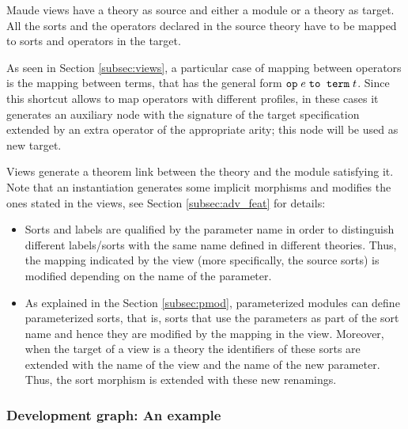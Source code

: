 Maude views have a theory as source and either a module or a theory
as target. All the sorts and the operators declared in the source theory
have to be mapped to sorts and operators in the target.

As seen in Section \ref{subsec:views}, a particular case of mapping
between operators is the mapping between
terms, that has the general form $\verb"op" \; e \; \verb"to term" \; t$.
Since this shortcut allows to map operators with different profiles,
in these cases it generates an auxiliary node with the signature of the
target specification extended by an extra operator of the appropriate arity;
this node will be used as new target.

Views generate a theorem
link between the theory and the module satisfying it.
Note that an instantiation generates some implicit morphisms and modifies
the ones stated in the views, see Section \ref{subsec:adv_feat} for details:
\begin{itemize}

\item
Sorts and labels are qualified by the parameter name in order to distinguish
different labels/sorts with the same name defined in different theories. Thus,
the mapping indicated by the view (more specifically, the source sorts) is
modified depending on the name of the parameter.

\item
As explained in the Section \ref{subsec:pmod}, parameterized modules can
define parameterized sorts, that is, sorts that use the parameters as part of
the sort name and hence they are modified by the mapping in the view.
Moreover, when the target of a view is a theory the identifiers of these sorts
are extended with the name of the view and the name of the new parameter.
%
Thus, the sort morphism is extended with these new renamings.

\end{itemize}



\subsubsection{Development graph: An example\label{subsubsec:dg_ex}}

